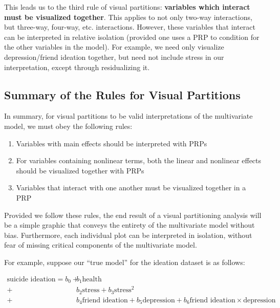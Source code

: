 \documentclass[
  man,floatsintext]{apa6}
\providecommand{\tightlist}{%
  \setlength{\itemsep}{0pt}\setlength{\parskip}{0pt}}
\begin{document}
This leads us to the third rule of visual partitions: \textbf{variables which interact must be visualized together}. This applies to not only two-way interactions, but three-way, four-way, etc. interactions. However, these variables that interact can be interpreted in relative isolation (provided one uses a PRP to condition for the other variables in the model). For example, we need only visualize depression/friend ideation together, but need not include stress in our interpretation, except through residualizing it.

\subsection{Summary of the Rules for Visual Partitions}\label{summary-of-the-rules-for-visual-partitions}

In summary, for visual partitions to be valid interpretations of the multivariate model, we must obey the following rules:

\begin{enumerate}
\def\labelenumi{\arabic{enumi}.}
\tightlist
\item
  Variables with main effects should be interpreted with PRPs
\item
  For variables containing nonlinear terms, both the linear and nonlinear effects should be visualized together with PRPs
\item
  Variables that interact with one another must be visualized together in a PRP
\end{enumerate}

Provided we follow these rules, the end result of a visual partitioning analysis will be a simple graphic that conveys the entirety of the multivariate model without bias. Furthermore, each individual plot can be interpreted in isolation, without fear of missing critical components of the multivariate model.

For example, suppose our ``true model'' for the ideation dataset is as follows:

\begin{align}
\label{eq:model} \text{suicide ideation}=b_0 +& b_1 \text{health} \\
\nonumber                              +& b_2 \text{stress} + b_3 \text{stress}^2 \\
\nonumber                              +& b_4 \text{friend ideation} + b_5 \text{depression} + b_6 \text{friend ideation} \times \text{depression} 
\end{align}
\end{document}
